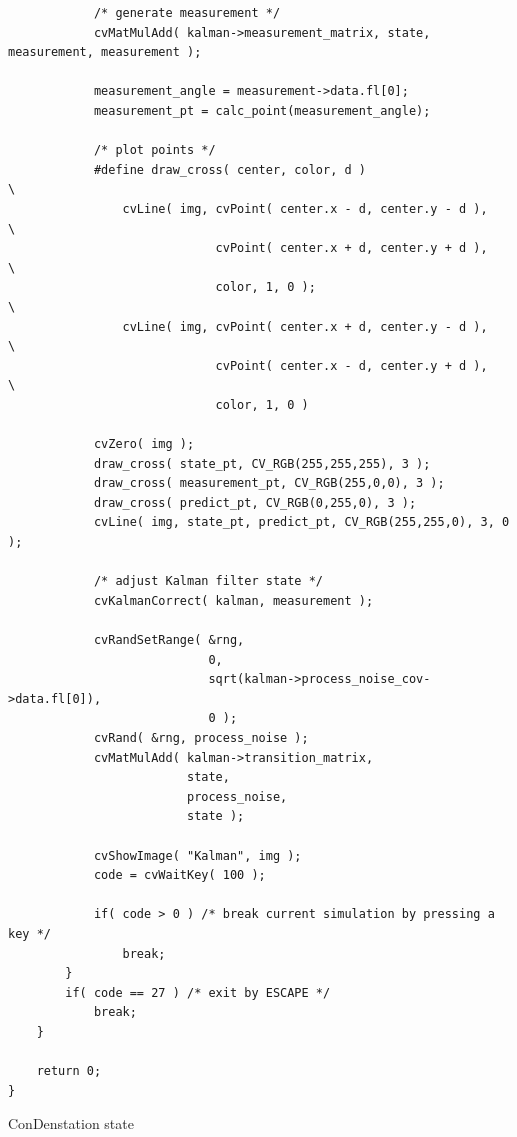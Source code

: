 \begin{lstlisting}
            /* generate measurement */
            cvMatMulAdd( kalman->measurement_matrix, state, measurement, measurement );

            measurement_angle = measurement->data.fl[0];
            measurement_pt = calc_point(measurement_angle);

            /* plot points */
            #define draw_cross( center, color, d )                        \
                cvLine( img, cvPoint( center.x - d, center.y - d ),       \
                             cvPoint( center.x + d, center.y + d ),       \
                             color, 1, 0 );                               \
                cvLine( img, cvPoint( center.x + d, center.y - d ),       \
                             cvPoint( center.x - d, center.y + d ),       \
                             color, 1, 0 )

            cvZero( img );
            draw_cross( state_pt, CV_RGB(255,255,255), 3 );
            draw_cross( measurement_pt, CV_RGB(255,0,0), 3 );
            draw_cross( predict_pt, CV_RGB(0,255,0), 3 );
            cvLine( img, state_pt, predict_pt, CV_RGB(255,255,0), 3, 0 );

            /* adjust Kalman filter state */
            cvKalmanCorrect( kalman, measurement );

            cvRandSetRange( &rng,
                            0,
                            sqrt(kalman->process_noise_cov->data.fl[0]),
                            0 );
            cvRand( &rng, process_noise );
            cvMatMulAdd( kalman->transition_matrix,
                         state,
                         process_noise,
                         state );

            cvShowImage( "Kalman", img );
            code = cvWaitKey( 100 );

            if( code > 0 ) /* break current simulation by pressing a key */
                break;
        }
        if( code == 27 ) /* exit by ESCAPE */
            break;
    }

    return 0;
}
\end{lstlisting}

\label{CvConDensation}

ConDenstation state


